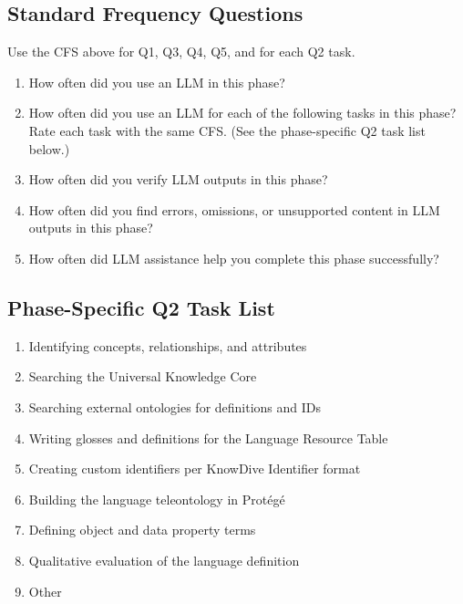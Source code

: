 \subsection*{Standard Frequency Questions}
Use the CFS above for Q1, Q3, Q4, Q5, and for each Q2 task.
\begin{enumerate}
  \item[Q1.] How often did you use an LLM in this phase?
  \item[Q2.] How often did you use an LLM for each of the following tasks in this phase? Rate each task with the same CFS. (See the phase-specific Q2 task list below.)
  \item[Q3.] How often did you verify LLM outputs in this phase?
  \item[Q4.] How often did you find errors, omissions, or unsupported content in LLM outputs in this phase?
  \item[Q5.] How often did LLM assistance help you complete this phase successfully?
\end{enumerate}

\subsection*{Phase-Specific Q2 Task List}
\begin{enumerate}
  \item[a.] Identifying concepts, relationships, and attributes
  \item[b.] Searching the Universal Knowledge Core
  \item[c.] Searching external ontologies for definitions and IDs
  \item[d.] Writing glosses and definitions for the Language Resource Table
  \item[e.] Creating custom identifiers per KnowDive Identifier format
  \item[f.] Building the language teleontology in Prot\'eg\'e
  \item[g.] Defining object and data property terms
  \item[h.] Qualitative evaluation of the language definition
  \item[i.] Other
\end{enumerate}

